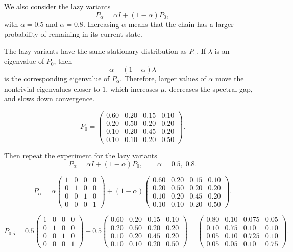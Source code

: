 We also consider the lazy variants \cite{figueras2026lab03}
\[
P_\alpha = \alpha I + (1-\alpha)P_0,
\]
with \(\alpha=0.5\) and \(\alpha=0.8\). Increasing \(\alpha\) means that the chain has a larger probability of remaining in its current state.

The lazy variants have the same stationary distribution as \(P_0\). If \(\lambda\) is an eigenvalue of \(P_0\), then
\[
\alpha + (1-\alpha)\lambda
\]
is the corresponding eigenvalue of \(P_\alpha\). Therefore, larger values of \(\alpha\) move the nontrivial eigenvalues closer to \(1\), which increases \(\mu\), decreases the spectral gap, and slows down convergence.

\[
P_0 =
\begin{pmatrix}
0.60 & 0.20 & 0.15 & 0.10 \\
0.20 & 0.50 & 0.20 & 0.20 \\
0.10 & 0.20 & 0.45 & 0.20 \\
0.10 & 0.10 & 0.20 & 0.50
\end{pmatrix}.\label{sec:P0_def}
\]

Then repeat the experiment for the lazy variants
\[
P_\alpha = \alpha I + (1-\alpha)P_0,
\qquad \alpha = 0.5,\; 0.8.
\]

\[
P_\alpha
=
\alpha
\begin{pmatrix}
1 & 0 & 0 & 0 \\
0 & 1 & 0 & 0 \\
0 & 0 & 1 & 0 \\
0 & 0 & 0 & 1
\end{pmatrix}
+
(1-\alpha)
\begin{pmatrix}
0.60 & 0.20 & 0.15 & 0.10 \\
0.20 & 0.50 & 0.20 & 0.20 \\
0.10 & 0.20 & 0.45 & 0.20 \\
0.10 & 0.10 & 0.20 & 0.50
\end{pmatrix}.
\]

\[
P_{0.5}
=
0.5
\begin{pmatrix}
1 & 0 & 0 & 0 \\
0 & 1 & 0 & 0 \\
0 & 0 & 1 & 0 \\
0 & 0 & 0 & 1
\end{pmatrix}
+
0.5
\begin{pmatrix}
0.60 & 0.20 & 0.15 & 0.10 \\
0.20 & 0.50 & 0.20 & 0.20 \\
0.10 & 0.20 & 0.45 & 0.20 \\
0.10 & 0.10 & 0.20 & 0.50
\end{pmatrix}
=
\begin{pmatrix}
0.80 & 0.10 & 0.075 & 0.05 \\
0.10 & 0.75 & 0.10 & 0.10 \\
0.05 & 0.10 & 0.725 & 0.10 \\
0.05 & 0.05 & 0.10 & 0.75
\end{pmatrix}.
\]

